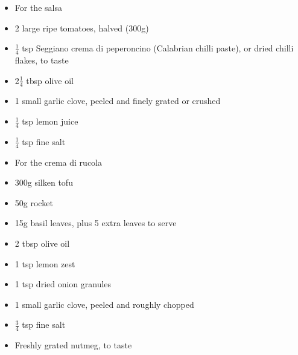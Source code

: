 \documentclass{book}
\begin{document}
\begin{itemize}
\item For the salsa
\item 2 large ripe tomatoes, halved (300g)
\item $\frac{1}{4}$ tsp Seggiano crema di peperoncino (Calabrian chilli paste), or dried chilli flakes, to taste
\item 2$\frac{1}{4}$ tbsp olive oil
\item 1 small garlic clove, peeled and finely grated or crushed
\item $\frac{1}{4}$ tsp lemon juice
\item $\frac{1}{4}$ tsp fine salt
\end{itemize}

\begin{itemize}
\item For the crema di rucola
\item 300g silken tofu
\item 50g rocket
\item 15g basil leaves, plus 5 extra leaves to serve
\item 2 tbsp olive oil
\item 1 tsp lemon zest
\item 1 tsp dried onion granules
\item 1 small garlic clove, peeled and roughly chopped
\item $\frac{3}{4}$ tsp fine salt
\item Freshly grated nutmeg, to taste
\end{itemize}
\end{document}
